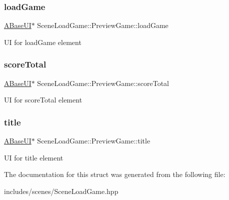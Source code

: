 \subsubsection{\texorpdfstring{load\+Game}{loadGame}}
{\footnotesize\ttfamily \hyperlink{class_a_base_u_i}{A\+Base\+UI}$\ast$ Scene\+Load\+Game\+::\+Preview\+Game\+::load\+Game}

UI for load\+Game element \mbox{\label{struct_scene_load_game_1_1_preview_game_ac239501a1f39bd30c32ea73b61016217}} 
\subsubsection{\texorpdfstring{score\+Total}{scoreTotal}}
{\footnotesize\ttfamily \hyperlink{class_a_base_u_i}{A\+Base\+UI}$\ast$ Scene\+Load\+Game\+::\+Preview\+Game\+::score\+Total}

UI for score\+Total element \mbox{\label{struct_scene_load_game_1_1_preview_game_a84ac5e731c48bcfe9290ec003dc07e8b}} 
\subsubsection{\texorpdfstring{title}{title}}
{\footnotesize\ttfamily \hyperlink{class_a_base_u_i}{A\+Base\+UI}$\ast$ Scene\+Load\+Game\+::\+Preview\+Game\+::title}

UI for title element 

The documentation for this struct was generated from the following file\+:\begin{DoxyCompactItemize}
\item 
includes/scenes/Scene\+Load\+Game.\+hpp\end{DoxyCompactItemize}
